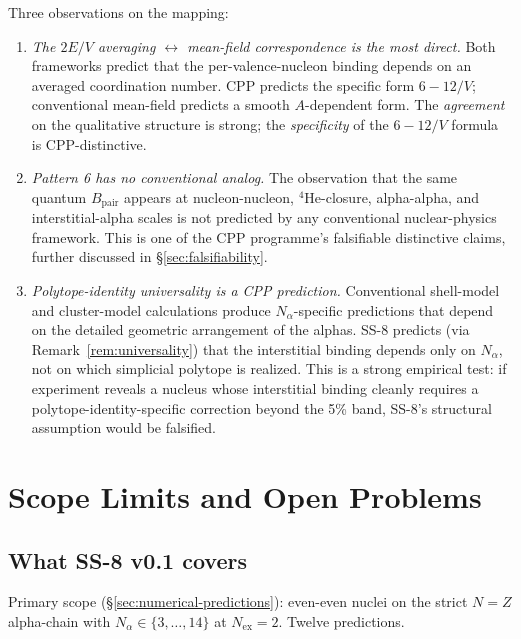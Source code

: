 \documentclass[11pt,letterpaper]{article}
\theoremstyle{definition}
\newcommand{\Bpair}{B_{\text{pair}}}
\newcommand{\Nalpha}{N_\alpha}
\newcommand{\Nex}{N_{\text{ex}}}
\begin{document}
Three observations on the mapping:

\begin{enumerate}
  \item \emph{The $2E/V$ averaging $\leftrightarrow$ mean-field correspondence is the most direct.} Both frameworks predict that the per-valence-nucleon binding depends on an averaged coordination number. CPP predicts the specific form $6 - 12/V$; conventional mean-field predicts a smooth $A$-dependent form. The \emph{agreement} on the qualitative structure is strong; the \emph{specificity} of the $6 - 12/V$ formula is CPP-distinctive.
  \item \emph{Pattern 6 has no conventional analog.} The observation that the same quantum $\Bpair$ appears at nucleon-nucleon, ${}^{4}\mathrm{He}$-closure, alpha-alpha, and interstitial-alpha scales is not predicted by any conventional nuclear-physics framework. This is one of the CPP programme's falsifiable distinctive claims, further discussed in \S\ref{sec:falsifiability}.
  \item \emph{Polytope-identity universality is a CPP prediction.} Conventional shell-model and cluster-model calculations produce $\Nalpha$-specific predictions that depend on the detailed geometric arrangement of the alphas. SS-8 predicts (via Remark~\ref{rem:universality}) that the interstitial binding depends only on $\Nalpha$, not on which simplicial polytope is realized. This is a strong empirical test: if experiment reveals a nucleus whose interstitial binding cleanly requires a polytope-identity-specific correction beyond the 5\% band, SS-8's structural assumption would be falsified.
\end{enumerate}


\section{Scope Limits and Open Problems}
\label{sec:scope-limits}

\subsection{What SS-8 v0.1 covers}
\label{sec:coverage}

Primary scope (\S\ref{sec:numerical-predictions}): even-even nuclei on the strict $N = Z$ alpha-chain with $\Nalpha \in \{3, \ldots, 14\}$ at $\Nex = 2$. Twelve predictions.
\end{document}
